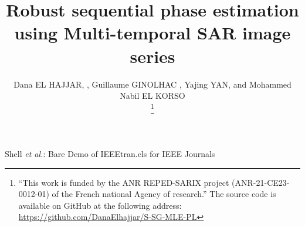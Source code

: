 \title{Robust sequential phase estimation using Multi-temporal SAR image series}

\author{Dana EL HAJJAR, , Guillaume GINOLHAC , Yajing YAN,  and Mohammed Nabil EL KORSO 

\vspace{-1cm}
\thanks{\noindent \footnotesize ``This work is funded by the ANR REPED-SARIX project (ANR-21-CE23-0012-01) of the French national Agency of research.'' 
The source code is available on GitHub at the following address: \href{https://github.com/DanaElhajjar/S-SG-MLE-PL}{https://github.com/DanaElhajjar/S-SG-MLE-PL} }}%


{Shell \MakeLowercase{\textit{et al.}}: Bare Demo of IEEEtran.cls for IEEE Journals}
\maketitle